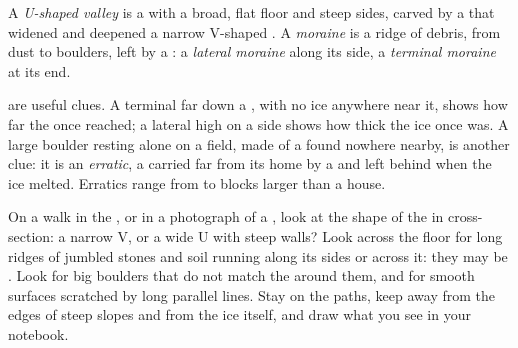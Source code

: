 \begin{definition}\label{def:g8:ice-on-earth:glacial-landforms}
A \emph{U-shaped valley} is a  with a broad, flat floor and steep
sides, carved by a  that widened and deepened a narrow V-shaped
 . A \emph{moraine} is a ridge of  debris, from dust to
boulders, left by a : a \emph{lateral moraine} along its side, a
\emph{terminal moraine} at its end.
\end{definition}

 are useful clues. A terminal  far down a , with no
ice anywhere near it, shows how far the  once reached; a lateral
 high on a  side shows how thick the ice once was. A large
boulder resting alone on a field, made of a  found nowhere nearby, is
another clue: it is an \emph{erratic}, a  carried far from its home by
a  and left behind when the ice melted. Erratics range from 
to blocks larger than a house.

\begin{inthefield}
On a walk in the , or in a photograph of a  , look
at the shape of the  in cross-section: a narrow V, or a wide U with
steep walls? Look across the  floor for long ridges of jumbled
stones and soil running along its sides or across it: they may be
. Look for big boulders that do not match the  around them,
and for smooth  surfaces scratched by long parallel lines. Stay on the
paths, keep away from the edges of steep slopes and from the ice itself,
and draw what you see in your notebook.
\end{inthefield}

